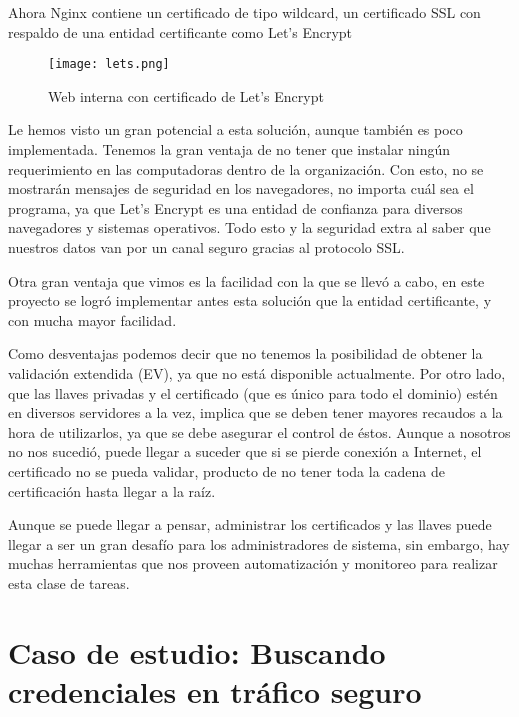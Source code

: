 Ahora Nginx contiene un certificado de tipo wildcard, un certificado SSL con respaldo de una 
entidad certificante como Let's Encrypt

\begin{center}
   \begin{figure}   
      \begin{center}
         \texttt{[image: lets.png]}
      \end{center}
      \caption{Web interna con certificado de Let’s Encrypt}
   \end{figure}
\end{center}

Le hemos visto un gran potencial a esta solución, aunque también es poco implementada. Tenemos la gran ventaja de no
tener que instalar ningún requerimiento en las computadoras dentro de la organización. Con esto, no se 
mostrarán mensajes de seguridad en los navegadores, no importa cuál sea el programa, ya que Let's Encrypt es 
una entidad de confianza para diversos navegadores y sistemas operativos. Todo esto y la seguridad extra al 
saber que nuestros datos van por un canal seguro gracias al protocolo SSL. 

Otra gran ventaja que vimos es la facilidad con la que se llevó a cabo, 
en este proyecto se logró implementar antes esta solución que la entidad certificante, y 
con mucha mayor facilidad. 

Como desventajas podemos decir que no tenemos la posibilidad de obtener la validación extendida (EV), ya que no está
disponible actualmente. Por otro lado, que las llaves privadas y el certificado (que es único para todo el dominio) 
estén en diversos servidores a la vez, implica
que se deben tener mayores recaudos a la hora de utilizarlos, ya que se debe asegurar el control de éstos. Aunque a 
nosotros no nos sucedió, puede llegar a suceder que si se pierde conexión a Internet, el certificado no se pueda validar,
producto de no tener toda la cadena de certificación hasta llegar a la raíz. 

Aunque se puede llegar a pensar, administrar los certificados y las llaves puede llegar a ser 
un gran desafío para los administradores de sistema, sin embargo, hay muchas herramientas que nos proveen
automatización y monitoreo para realizar esta clase de tareas. 


\section{Caso de estudio: Buscando credenciales en tráfico seguro}

